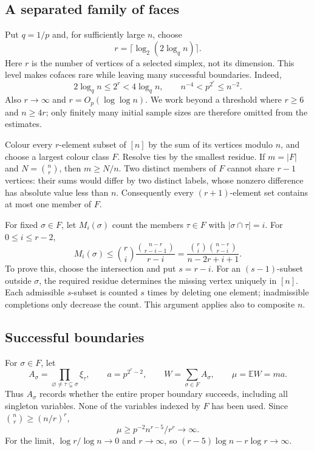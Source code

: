 \documentclass[11pt,a4paper]{article}
\newcommand{\E}{\mathbb E}
\begin{document}
\subsection{A separated family of faces}

Put $q=1/p$ and, for sufficiently large $n$, choose
\begin{equation}\label{eq:level}
r=\lceil\log_2(2\log_q n)\rceil.
\end{equation}
Here $r$ is the number of vertices of a selected simplex, not its
dimension. This level makes cofaces rare while leaving many successful
boundaries. Indeed,
\begin{equation}\label{eq:powers}
2\log_q n\le2^r<4\log_q n,\qquad
n^{-4}<p^{2^r}\le n^{-2}.
\end{equation}
Also $r\to\infty$ and $r=O_p(\log\log n)$. We work beyond a threshold
where $r\ge6$ and $n\ge4r$; only finitely many initial sample sizes are
therefore omitted from the estimates.

Colour every $r$-element subset of $[n]$ by the sum of its vertices
modulo $n$, and choose a largest colour class $F$. Resolve ties by
the smallest residue. If $m=|F|$ and $N=\binom nr$, then $m\ge N/n$.
Two distinct members of $F$ cannot share $r-1$ vertices: their sums
would differ by two distinct labels, whose nonzero difference has
absolute value less than $n$. Consequently every $(r+1)$-element
set contains at most one member of $F$.

For fixed $\sigma\in F$, let $M_i(\sigma)$ count the members $\tau\in F$
with $|\sigma\cap\tau|=i$. For $0\le i\le r-2$,
\begin{equation}\label{eq:completion}
M_i(\sigma)\le
\binom ri\frac{\binom{n-r}{r-i-1}}{r-i}
=\frac{\binom ri\binom{n-r}{r-i}}{n-2r+i+1}.
\end{equation}
To prove this, choose the intersection and put $s=r-i$. For an
$(s-1)$-subset outside $\sigma$, the required residue determines
the missing vertex uniquely in $[n]$. Each admissible $s$-subset is
counted $s$ times by deleting one element; inadmissible completions
only decrease the count. This argument applies also to composite $n$.

\subsection{Successful boundaries}

For $\sigma\in F$, let
\[
A_\sigma=\prod_{\varnothing\ne\tau\subsetneq\sigma}\xi_\tau,
\qquad a=p^{2^r-2},\qquad
W=\sum_{\sigma\in F}A_\sigma,\qquad \mu=\E W=ma.
\]
Thus $A_\sigma$ records whether the entire proper boundary succeeds,
including all singleton variables. None of the variables indexed by
$F$ has been used. Since $\binom nr\ge(n/r)^r$,
\begin{equation}\label{eq:mean}
\mu\ge p^{-2}n^{r-5}/r^r\longrightarrow\infty.
\end{equation}
For the limit, $\log r/\log n\to0$ and $r\to\infty$, so
$(r-5)\log n-r\log r\to\infty$.
\end{document}
